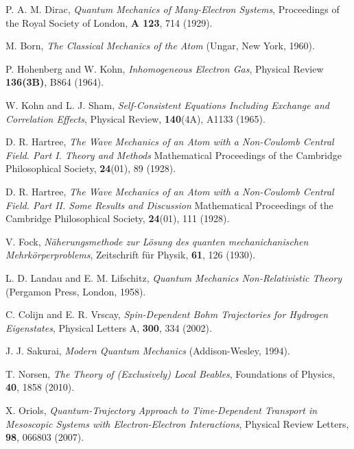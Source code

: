 \documentclass[onecolumn,nofootinbib, secnumarabic, amsmath, nobibnotes,12pt,aps,pra]{revtex4-1}
\begin{document}
\begin{thebibliography}{999}
P. A. M. Dirac, \emph{Quantum Mechanics of Many-Electron Systems}, Proceedings of the Royal Society of London, \textbf{A 123},  714 (1929).

M. Born, \emph{The Classical Mechanics of the Atom} (Ungar, New York, 1960).

P. Hohenberg and W. Kohn, \emph{Inhomogeneous Electron Gas}, Physical Review {\bf 136(3B)},  B864 (1964).

W. Kohn and L. J. Sham, \emph{Self-Consistent Equations Including Exchange and Correlation Effects}, Physical Review, \textbf{140}(4A),  A1133  (1965).

D. R. Hartree, \emph{The Wave Mechanics of an Atom with a Non-Coulomb Central Field. Part I. Theory and Methods} Mathematical Proceedings of the Cambridge Philosophical Society, \textbf{24}(01),  89 (1928).

D. R. Hartree, \emph{The Wave Mechanics of an Atom with a Non-Coulomb Central Field. Part II. Some Results and Discussion} Mathematical Proceedings of the Cambridge Philosophical Society, \textbf{24}(01),  111 (1928).

V. Fock, \emph{N\"{a}herungsmethode zur L\"{o}sung des quanten mechanichanischen Mehrk\"{o}rperproblems}, Zeitschrift f\"{u}r Physik, \textbf{61},  126 (1930).

L. D. Landau and E. M. Lifschitz, \emph{Quantum Mechanics Non-Relativistic Theory} (Pergamon Press, London, 1958).

C. Colijn and E. R. Vrscay, \emph{Spin-Dependent Bohm Trajectories for Hydrogen Eigenstates}, Physical Letters A, \textbf{300}, 334 (2002).

J. J. Sakurai, \emph{Modern Quantum Mechanics} (Addison-Wesley, 1994).

T. Norsen, \textit{The Theory of (Exclusively) Local Beables}, Foundations of Physics, \textbf{40}, 1858 (2010).

X. Oriols, \emph{Quantum-Trajectory Approach to Time-Dependent Transport in Mesoscopic Systems with Electron-Electron Interactions}, Physical Review Letters, \textbf{98},  066803 (2007).


\end{thebibliography}
\end{document}
